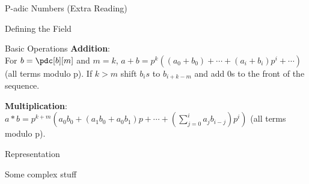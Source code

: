 \documentclass[12pt, letterpaper]{article}
\begin{document}
\begin{section}{P-adic Numbers (Extra Reading)}
\begin{subsection}{Defining the Field}
\begin{subsubsection}{Basic Operations}
      \textbf{Addition}: \\
      For \(b = \pdc[b][m]\) and \(m = k\), \(a + b = p^{k}((a_{0} + b_{0}) +
      \cdots + (a_{i} + b_{i})p^{i} + \cdots)\) (all terms modulo p). If \(k >
      m\) shift \(b_{i}s\) to \(b_{i + k - m}\) and add 0s to the front of the
      sequence.

      \textbf{Multiplication}: \\
      \(a * b = p^{k + m}(a_{0}b_{0} + (a_{1}b_{0} + a_{0}b_{1})p + \cdots +
      (\sum^{i}_{j = 0} a_{j} b_{i - j})p^{i})\) (all terms modulo p).

    \end{subsubsection}

    \begin{subsubsection}{Representation}

      Some complex stuff

    \end{subsubsection}

  \end{subsection}

\end{section}
\end{document}
